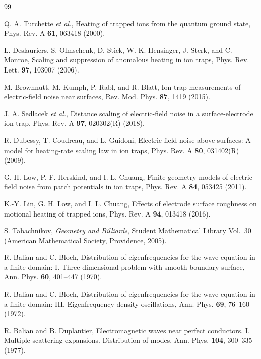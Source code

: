 \documentclass[aps,pra,twocolumn,superscriptaddress,longbibliography,nofootinbib,floatfix]{revtex4-2}
\theoremstyle{remark}
\begin{document}
\begin{thebibliography}{99}

Q. A. Turchette \emph{et al.}, Heating of trapped ions from the quantum ground state, Phys. Rev. A \textbf{61}, 063418 (2000).

L. Deslauriers, S. Olmschenk, D. Stick, W. K. Hensinger, J. Sterk, and C. Monroe, Scaling and suppression of anomalous heating in ion traps, Phys. Rev. Lett. \textbf{97}, 103007 (2006).

M. Brownnutt, M. Kumph, P. Rabl, and R. Blatt, Ion-trap measurements of electric-field noise near surfaces, Rev. Mod. Phys. \textbf{87}, 1419 (2015).

J. A. Sedlacek \emph{et al.}, Distance scaling of electric-field noise in a surface-electrode ion trap, Phys. Rev. A \textbf{97}, 020302(R) (2018).

R. Dubessy, T. Coudreau, and L. Guidoni, Electric field noise above surfaces: A model for heating-rate scaling law in ion traps, Phys. Rev. A \textbf{80}, 031402(R) (2009).

G. H. Low, P. F. Herskind, and I. L. Chuang, Finite-geometry models of electric field noise from patch potentials in ion traps, Phys. Rev. A \textbf{84}, 053425 (2011).

K.-Y. Lin, G. H. Low, and I. L. Chuang, Effects of electrode surface roughness on motional heating of trapped ions, Phys. Rev. A \textbf{94}, 013418 (2016).

S. Tabachnikov, \emph{Geometry and Billiards}, Student Mathematical Library Vol.~30 (American Mathematical Society, Providence, 2005).

R. Balian and C. Bloch, Distribution of eigenfrequencies for the wave equation in a finite domain: I. Three-dimensional problem with smooth boundary surface, Ann. Phys. \textbf{60}, 401--447 (1970).

R. Balian and C. Bloch, Distribution of eigenfrequencies for the wave equation in a finite domain: III. Eigenfrequency density oscillations, Ann. Phys. \textbf{69}, 76--160 (1972).

R. Balian and B. Duplantier, Electromagnetic waves near perfect conductors. I. Multiple scattering expansions. Distribution of modes, Ann. Phys. \textbf{104}, 300--335 (1977).


\end{thebibliography}
\end{document}
